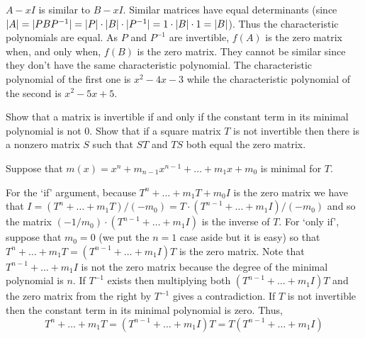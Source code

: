 \begin{exercises}
\begin{answer}
\begin{exparts}
           $A-xI$ is similar to $B-xI$.
           Similar matrices have equal determinants (since 
           $\deter{A}=\deter{PBP^{-1}}
               =\deter{P}\cdot\deter{B}\cdot\deter{P^{-1}}
               =1\cdot\deter{B}\cdot 1=\deter{B}$).
           Thus the characteristic polynomials are equal. 
         \partsitem 
           As \( P \) and \( P^{-1} \) are invertible, \( f(A) \) is the
           zero matrix when, and only when, \( f(B) \) is the zero matrix.
         \partsitem They cannot be similar since they don't have the same
           characteristic polynomial.
           The characteristic polynomial of the first one is 
           $x^2-4x-3$ while the characteristic polynomial of the 
           second is $x^2-5x+5$.
       \end{exparts}  
     \end{answer}
   \item 
    \begin{exparts}
     \partsitem Show that a matrix is invertible if and only if 
       the constant term
       in its minimal polynomial is not $0$.
     \partsitem Show that if a square matrix \( T \) is not invertible     
       then there is
       a nonzero matrix \( S \) such that \( ST \) and \( TS \) both equal the
       zero matrix.
     \end{exparts}
     \begin{answer}
      Suppose that \( m(x)=x^n+m_{n-1}x^{n-1}+\dots+m_1x+m_0 \)
      is minimal for \( T \).
      \begin{exparts}
       \partsitem 
         For the `if' argument, 
         because \( T^n+\dots+m_1T+m_0I \) is the zero matrix we
         have that \( I=(T^n+\dots+m_1T)/(-m_0)=
         T\cdot (T^{n-1}+\dots+m_1I)/(-m_0) \) and so 
         the matrix $(-1/m_0)\cdot (T^{n-1}+\dots+m_1I)$ is the inverse of $T$.
         For `only if', suppose that \( m_0=0 \) 
         (we put the \( n=1 \) case aside but it is easy) so that
         \( T^n+\dots+m_1T=(T^{n-1}+\dots+m_1I)T \) is the zero matrix.
         Note that \( T^{n-1}+\dots+m_1I \) is not the zero matrix because
         the degree of the minimal polynomial is \( n \).
         If \( T^{-1} \) exists then multiplying both
         \( (T^{n-1}+\dots+m_1I)T \) and the zero matrix from the right 
         by $T^{-1}$ gives a contradiction.
       \partsitem If \( T \) is not invertible then the constant term in its
         minimal polynomial is zero.
         Thus,
         \begin{equation*}
            T^n+\dots+m_1T=(T^{n-1}+\dots+m_1I)T=T(T^{n-1}+\dots+m_1I)

\end{equation*}
\end{exparts}
\end{answer}
\end{exercises}
